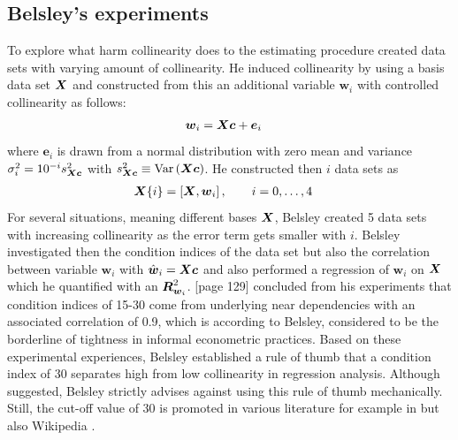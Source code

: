 \documentclass[11pt,a4paper,twoside]{book}\usepackage[]{graphicx}\usepackage[]{xcolor}
\begin{document}
\newpage
\subsection{Belsley's experiments}\label{sec:belsleysexperiment}
To explore what harm collinearity does to the estimating procedure \cite{Belsley1991} created data sets with varying amount of collinearity. He induced collinearity by using a basis data set ${\boldsymbol{X}}$ and constructed from this an additional variable $\boldsymbol{w}_i$ with controlled collinearity as follows:
\begin{align*}
\boldsymbol{w}_i&={\boldsymbol{X}}\boldsymbol{c} + \boldsymbol{e}_i
\end{align*}
where $\boldsymbol{e}_i$ is drawn from a normal distribution with zero mean and variance $\sigma_i^2=10^{-i}s^2_{{\boldsymbol{X}}\boldsymbol{c}}$ with $s^2_{{\boldsymbol{X}}\boldsymbol{c}}\equiv\operatorname{Var}\left({{\boldsymbol{X}}\boldsymbol{c}}\right)$.
He constructed then $i$ data sets as 
\begin{align*}
{\boldsymbol{X}}\{i\}&=\left[{\boldsymbol{X}},\boldsymbol{w}_i\right],\qquad i=0,\dots,4
\end{align*}
For several situations, meaning different bases ${\boldsymbol{X}}$, Belsley created 5 data sets with increasing collinearity as the error term gets smaller with $i$. Belsley investigated then the condition indices of the data set but also the correlation between variable $\boldsymbol{w}_i$ with $\hat{\boldsymbol{w}}_i={\boldsymbol{X}}\boldsymbol{c}$ and also performed a regression of $\boldsymbol{w}_i$ on ${\boldsymbol{X}}$ which he quantified with an ${\boldsymbol{R}}_{\boldsymbol{w}_i}^2$.
\cite{Belsley1991}[page 129] concluded from his experiments that condition indices of 15-30 come from underlying near dependencies with an associated correlation of 0.9, which is according to Belsley, considered to be the borderline of tightness in informal econometric practices. 
Based on these experimental experiences, Belsley established a rule of thumb that a condition index of 30 separates high from low collinearity in regression analysis.
Although suggested, Belsley strictly advises against using this rule of thumb mechanically.
Still, the cut-off value of 30 is promoted in various literature for example in \cite{Cohen2013, Hocking2013, Tabachnick2012,Chatterjee2012} but also Wikipedia \citep{wiki_multicoll}. 
\end{document}
